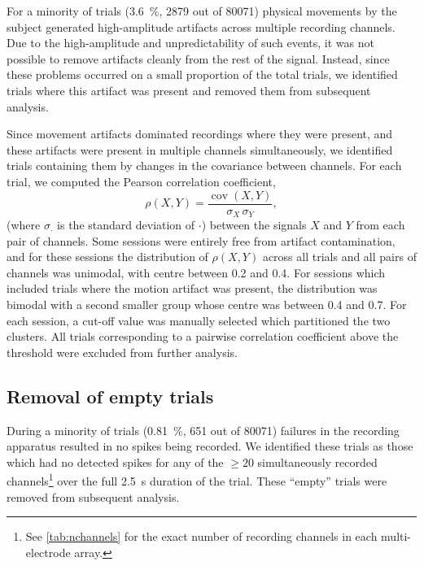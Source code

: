 For a minority of trials (\SI{3.6}{\percent}, \num{2879} out of \num{80071}) physical movements by the subject generated high-amplitude artifacts across multiple recording channels.
Due to the high-amplitude and unpredictability of such events, it was not possible to remove artifacts cleanly from the rest of the signal.
Instead, since these problems occurred on a small proportion of the total trials, we identified trials where this artifact was present and removed them from subsequent analysis.

Since movement artifacts dominated recordings where they were present, and these artifacts were present in multiple channels simultaneously, we identified trials containing them by changes in the covariance between channels.
For each trial, we computed the Pearson correlation coefficient,
\begin{equation}
\label{eq:pearson}
\rho(X,Y) = \frac{\operatorname{cov}(X,Y)}{\sigma_X \, \sigma_Y}
,\end{equation}
(where $\sigma_\cdot$ is the standard deviation of $\cdot$) between the signals $X$ and $Y$ from each pair of channels.
Some sessions were entirely free from artifact contamination, and for these sessions the distribution of $\rho(X,Y)$ across all trials and all pairs of channels was unimodal, with centre between \num{0.2} and \num{0.4}.
For sessions which included trials where the motion artifact was present, the distribution was bimodal with a second smaller group whose centre was between \num{0.4} and \num{0.7}.
For each session, a cut-off value was manually selected which partitioned the two clusters.
All trials corresponding to a pairwise correlation coefficient above the threshold were excluded from further analysis.



\subsection{Removal of empty trials}
\label{sec:pl_empty_trials}

During a minority of trials (\SI{0.81}{\percent}, \num{651} out of \num{80071}) failures in the recording apparatus resulted in no spikes being recorded.
We identified these trials as those which had no detected spikes for any of the ${\ge}20$ simultaneously recorded channels\footnote{See \autoref{tab:nchannels} for the exact number of recording channels in each multi-electrode array.} over the full \SI{2.5}{\second} duration of the trial.
These ``empty'' trials were removed from subsequent analysis.


